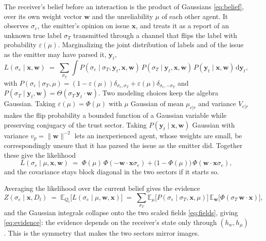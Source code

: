 \documentclass{article}
\newcommand{\hw}{h_{w}}
\newcommand{\hmu}{h_{\mu}}
\begin{document}
The receiver's belief before an interaction is the product of Gaussians
\eqref{eq:belief}, over its own weight vector $\mathbf{w}$ and the unreliability
$\mu$ of each other agent. It observes $\sigma_e$, the emitter's opinion on issue
$\mathbf{x}$, and treats it as a report of an unknown true label $\sigma_T$
transmitted through a channel that flips the label with probability
$\varepsilon(\mu)$. Marginalizing the joint distribution of labels and of the issue
as the emitter may have parsed it, $\mathbf{y}_t$,
%
\begin{equation}
  L(\sigma_e\mid \mathbf{x}, \mathbf{w}) \;=\;
  \sum_{\sigma_T}\int P(\sigma_e\mid \sigma_T, \mathbf{y}_t, \mathbf{x}, \mathbf{w})\,
  P(\sigma_T\mid \mathbf{y}_t, \mathbf{x}, \mathbf{w})\,P(\mathbf{y}_t\mid \mathbf{x}, \mathbf{w})\,\mathrm{d}\mathbf{y}_t ,
\end{equation}
%
with $P(\sigma_e\mid\sigma_T,\mu)=(1-\varepsilon(\mu))\delta_{\sigma_e,\sigma_T} +
\varepsilon(\mu)\delta_{\sigma_e,-\sigma_T}$ and
$P(\sigma_T\mid \mathbf{y}_t,\mathbf{w})=\Theta(\sigma_T\, \mathbf{y}_t\cdot \mathbf{w})$. Two modeling choices keep
the algebra Gaussian. Taking $\varepsilon(\mu)=\Phi(\mu)$ with $\mu$ Gaussian of mean
$\mu_{e|r}$ and variance $V_{e|r}$ makes the flip probability a bounded function
of a Gaussian variable while preserving conjugacy of the trust sector. Taking
$P(\mathbf{y}_t\mid \mathbf{x},\mathbf{w})$ Gaussian with variance $v_p=\|\mathbf{w}\|^{-2}$ lets an
inexperienced agent, whose weights are small, be correspondingly unsure that it
has parsed the issue as the emitter did. Together these give the likelihood
%
\begin{equation}
  L(\sigma_e\mid \mu, \mathbf{x}, \mathbf{w}) \;=\;
  \Phi(\mu)\,\Phi(-\mathbf{w}\cdot\mathbf{x}\sigma_e)
  + \bigl(1-\Phi(\mu)\bigr)\,\Phi(\mathbf{w}\cdot\mathbf{x}\sigma_e),
  \label{eq:likelihood}
\end{equation}
%
and the covariance stays block diagonal in the two sectors if it starts so.

Averaging the likelihood over the current belief gives the evidence
%
\begin{equation}
  Z(\sigma_e\mid \mathbf{x}, D_t) \;=\; \mathbb{E}_{Q_t}\bigl[L(\sigma_e\mid \mu, \mathbf{w}, \mathbf{x})\bigr]
  \;=\;\sum_{\sigma_T}\mathbb{E}_{\mu}\bigl[P(\sigma_e\mid\sigma_T,\mathbf{x},\mu)\bigr]\,
  \mathbb{E}_{\mathbf{w}}\bigl[\Phi(\sigma_T\, \mathbf{w}\cdot\mathbf{x})\bigr],
\end{equation}
%
and the Gaussian integrals collapse onto the two scaled fields
\eqref{eq:fields}, giving \eqref{eq:evidence}: the evidence depends on the
receiver's state only through $(\hw,\hmu)$. This is the symmetry that makes the
two sectors mirror images.
\end{document}
